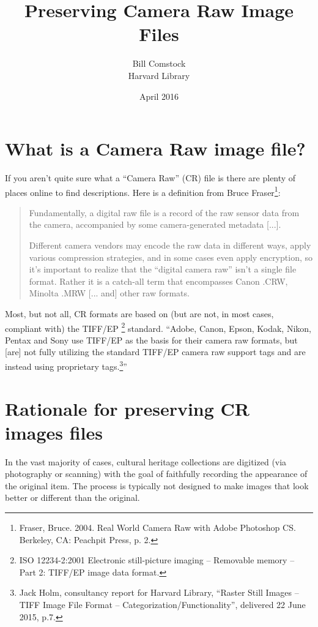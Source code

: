 \documentclass[11pt,a4paper]{article}
\begin{document}
\title{Preserving Camera Raw Image Files}
\author{Bill Comstock\\
Harvard Library}
\date{April 2016}

\maketitle

\section{What is a Camera Raw image file?}
If you aren’t quite sure what a “Camera Raw” (CR) file is there are plenty of places online to find  descriptions. Here is a definition from Bruce Fraser\footnote{Fraser, Bruce. 2004. Real World Camera Raw with Adobe Photoshop CS. Berkeley, CA: Peachpit Press, p. 2.}:

\begin{quote}Fundamentally, a digital raw file is a record of the raw sensor data from the camera, accompanied by some camera-generated metadata [...].

Different camera vendors may encode the raw data in different ways, apply various compression strategies, and in some cases even apply encryption, so it’s important to realize that the “digital camera raw” isn’t a single file format. Rather it is a catch-all term that encompasses Canon .CRW, Minolta .MRW [... and] other raw formats.\end{quote}

Most, but not all, CR formats are based on (but are not, in most cases, compliant with) the TIFF/EP \footnote{ISO 12234-2:2001 Electronic still-picture imaging -- Removable memory -- Part 2: TIFF/EP image data format.} standard. “Adobe, Canon, Epson, Kodak, Nikon, Pentax and Sony use TIFF/EP as the basis for their camera raw formats, but [are] not fully utilizing the standard TIFF/EP camera raw support tags and are instead using proprietary tags.\footnote{Jack Holm, consultancy report for Harvard Library, “Raster Still Images -- TIFF Image File Format -- Categorization/Functionality”, delivered 22 June 2015, p.7.}”

\section{Rationale for preserving CR images files}
In the vast majority of cases, cultural heritage collections are digitized (via photography or scanning) with the goal of faithfully recording the appearance of the original item. The process is typically not designed to make images that look better or different than the original.
\end{document}

